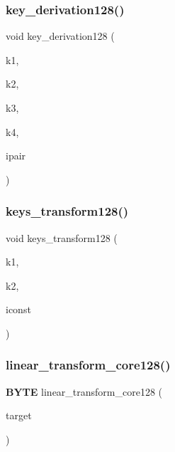 \mbox{\label{_kuznyechik_8cpp_af4a464229da01061519ea3794d8e3a80}} 
\subsubsection{key\+\_\+derivation128()}
{\footnotesize\ttfamily void key\+\_\+derivation128 (\begin{DoxyParamCaption}\item[{\textbf{ B\+Y\+TE} $\ast$}]{k1,  }\item[{\textbf{ B\+Y\+TE} $\ast$}]{k2,  }\item[{\textbf{ B\+Y\+TE} $\ast$}]{k3,  }\item[{\textbf{ B\+Y\+TE} $\ast$}]{k4,  }\item[{int}]{ipair }\end{DoxyParamCaption})}

\mbox{\label{_kuznyechik_8cpp_ab7697e490e274b3972f42e0ec0b301bd}} 
\subsubsection{keys\+\_\+transform128()}
{\footnotesize\ttfamily void keys\+\_\+transform128 (\begin{DoxyParamCaption}\item[{\textbf{ B\+Y\+TE} $\ast$}]{k1,  }\item[{\textbf{ B\+Y\+TE} $\ast$}]{k2,  }\item[{int}]{iconst }\end{DoxyParamCaption})}

\mbox{\label{_kuznyechik_8cpp_ac29da35f715077f639688ac9f3c8f1f4}} 
\subsubsection{linear\+\_\+transform\+\_\+core128()}
{\footnotesize\ttfamily \textbf{ B\+Y\+TE} linear\+\_\+transform\+\_\+core128 (\begin{DoxyParamCaption}\item[{const \textbf{ B\+Y\+TE} $\ast$}]{target }\end{DoxyParamCaption})}

